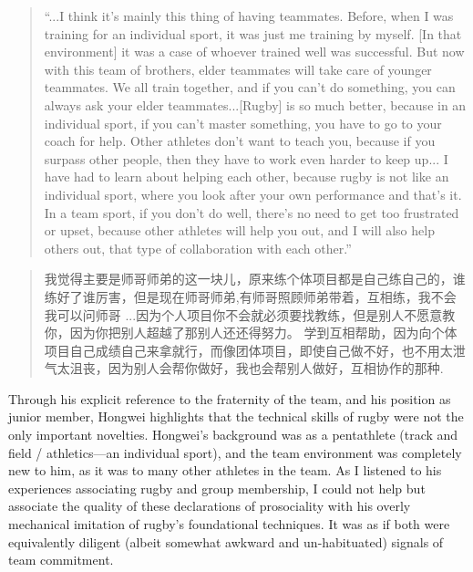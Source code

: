 \begin{CJK}{UTF8}{gbsn}
\begin{quotation}
  ``...I think it's mainly this thing of having teammates. Before, when I was training for an individual sport, it was just me training by myself. [In that environment] it was a case of whoever trained well was successful.  But now with this team of brothers, elder teammates will take care of younger teammates. We all train together, and if you can’t do something, you can always ask your elder teammates...[Rugby] is so much better, because in an individual sport, if you can't master something, you have to go to your coach for help. Other athletes don't want to teach you, because if you surpass other people, then they have to work even harder to keep up... I have had to learn about helping each other, because rugby is not like an individual sport, where you look after your own performance and that's it.  In a team sport, if you don't do well, there's no need to get too frustrated or upset, because other athletes will help you out, and I will also help others out, that type of collaboration with each other.''
\end{quotation}

\begin{CJK}{UTF8}{gbsn}
  \begin{quotation}
    我觉得主要是师哥师弟的这一块儿，原来练个体项目都是自己练自己的，谁练好了谁厉害，但是现在师哥师弟,有师哥照顾师弟带着，互相练，我不会我可以问师哥
    ...因为个人项目你不会就必须要找教练，但是别人不愿意教你，因为你把别人超越了那别人还还得努力。 学到互相帮助，因为向个体项目自己成绩自己来拿就行，而像团体项目，即使自己做不好，也不用太泄气太沮丧，因为别人会帮你做好，我也会帮别人做好，互相协作的那种.
  \end{quotation}
\end{CJK}

Through his explicit reference to the fraternity of the team, and his position as junior member, Hongwei highlights that the technical skills of rugby were not the only important novelties.  Hongwei's background was as a pentathlete (track and field / athletics---an individual sport), and the team environment was completely new to him, as it was to many other athletes in the team.  As I listened to his experiences associating rugby and group membership, I could not help but associate the quality of these declarations of prosociality with his overly mechanical imitation of rugby's foundational techniques.  It was as if both were equivalently diligent (albeit somewhat awkward and un-habituated) signals of team commitment.


\end{CJK}
